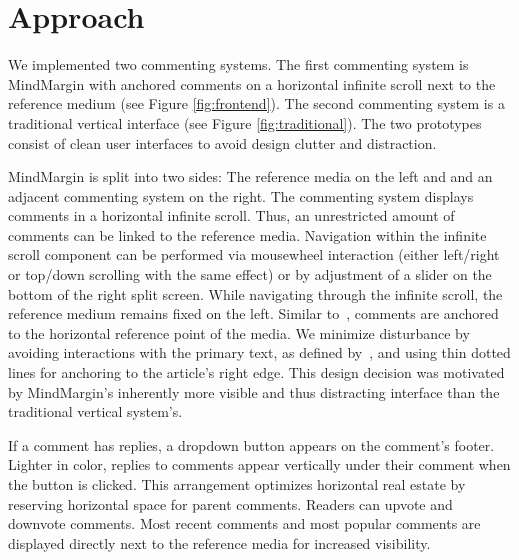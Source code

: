 \section {Approach}

We implemented two commenting systems. The first commenting system is MindMargin with anchored comments on a horizontal infinite scroll next to the reference medium (see Figure \ref{fig:frontend}). The second commenting system is a traditional vertical interface (see Figure \ref{fig:traditional}). The two prototypes consist of clean user interfaces to avoid design clutter and distraction. 

MindMargin is split into two sides: The reference media on the left and and an adjacent commenting system on the right. The commenting system displays comments in a horizontal infinite scroll. Thus, an unrestricted amount of comments can be linked to the reference media. Navigation within the infinite scroll component can be performed via mousewheel interaction (either left/right or top/down scrolling with the same effect) or by adjustment of a slider on the bottom of the right split screen. While navigating through the infinite scroll, the reference medium remains fixed on the left. Similar to~\cite{FluidDocs, NB}, comments are anchored to the horizontal reference point of the media. We minimize disturbance by avoiding interactions with the primary text, as defined by~\cite{FluidDocs}, and using thin dotted lines for anchoring to the article's right edge. This design decision was motivated by MindMargin's inherently more visible and thus distracting interface than the traditional vertical system's. 

If a comment has replies, a dropdown button appears on the comment's footer. Lighter in color, replies to comments appear vertically under their comment when the button is clicked. This arrangement optimizes horizontal real estate by reserving horizontal space for parent comments. Readers can upvote and downvote comments. Most recent comments and most popular comments are displayed directly next to the reference media for increased visibility.


